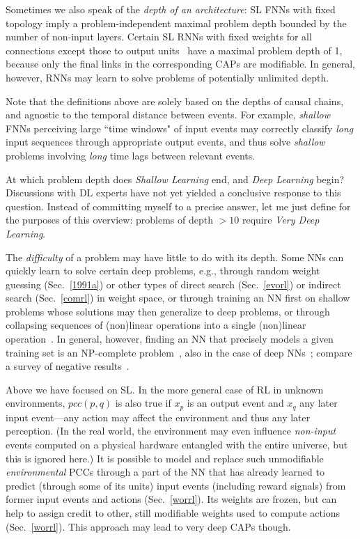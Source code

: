 \documentclass[letterpaper]{article}
\begin{document}
\begin{CJK*}{UTF8}{gbsn}
Sometimes we also speak of the {\em depth of an architecture}:
SL FNNs with fixed topology imply a problem-independent maximal problem depth bounded by
 the number of non-input layers.
Certain SL RNNs
with fixed weights for all 
connections except those to output units~\citep{Jaeger2001a,maass2002,Jaeger:04,schrauwen2007} 
have
a maximal problem depth of 1,
because only the final links in the corresponding CAPs are modifiable. 
In general, however, RNNs 
may learn to solve problems of potentially unlimited depth.

Note that the definitions above are 
solely based on the depths of causal chains, and
agnostic to the temporal distance between events.
For example, {\em shallow} FNNs perceiving large ``time windows" of input events may 
correctly classify {\em long} input sequences through appropriate output events, and thus 
solve {\em shallow}
problems involving {\em long} time lags between relevant events.

At which problem depth does {\em Shallow Learning} end, and {\em Deep Learning} begin?
Discussions with DL
experts have not yet yielded a conclusive response to this question. Instead of committing myself to a precise 
answer, let me just define for the purposes of this overview:
problems of depth $>10$ require 
{\em Very Deep Learning}.

The {\em difficulty} of a problem may have little to do with its depth. 
Some NNs can quickly learn to solve certain deep problems,
e.g., through random weight guessing (Sec.~\ref{1991a})
or other types of direct search (Sec.~\ref{evorl}) or indirect search (Sec.~\ref{comrl}) in weight space,
or through training an NN first on shallow problems whose solutions may then generalize to deep problems,
or through collapsing sequences of (non)linear operations into a single (non)linear 
operation~\citep[but see an analysis of non-trivial aspects of deep linear networks,][Section B]{baldihornik95}.
In general, however, finding an NN that precisely models a given training set is an 
NP-complete problem~\citep{judd1990,blum1992},
also in the case of deep NNs~\citep{sima1994,souto1999,windisch2005};
compare a survey of negative results~\citep[Section 1]{sima2002}.


Above we have focused on SL.
In the more general case of RL in unknown environments, 
$pcc(p,q)$ is also true if $x_p$ is an output event and $x_q$ 
any later input event---any action may affect the environment and thus any later perception.
(In the real world, the environment may even influence {\em non-input} events 
computed on a physical hardware entangled with the entire universe, 
but this is ignored here.) 
It is possible to model and replace
such unmodifiable {\em environmental} PCCs
through a part of the NN that has already learned to predict (through some of its units) 
 input events (including reward signals) from
former input events and actions (Sec.~\ref{worrl}). Its weights are frozen,
but can help to assign credit to other, still modifiable weights used to compute actions (Sec.~\ref{worrl}).
This approach may lead to very deep CAPs though. 



\end{CJK*}
\end{document}
